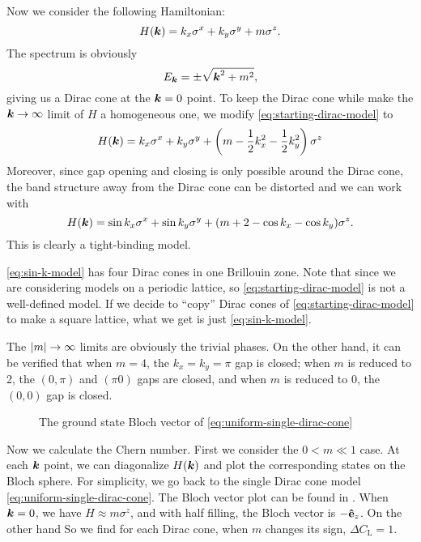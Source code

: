 \documentclass[hyperref, a4paper]{article}
\begin{document}
Now we consider the following Hamiltonian:
\begin{equation}
    H(\vb*{k}) = k_x \sigma^x + k_y \sigma^y + m \sigma^z.
    \label{eq:starting-dirac-model}
\end{equation}
The spectrum is obviously 
\begin{equation}
    E_{\vb*{k}} = \pm \sqrt{\vb*{k}^2 + m^2},
\end{equation}
giving us a Dirac cone at the $\vb*{k} = 0$ point. To keep the Dirac cone while make the $\vb*{k} \to \infty$ limit of $H$ a homogeneous one, we modify \eqref{eq:starting-dirac-model} to
\begin{equation}
    H(\vb*{k}) = k_x \sigma^x + k_y \sigma^y + \left(m - \frac{1}{2} k_x^2 - \frac{1}{2} k_y^2 \right) \sigma^z
    \label{eq:uniform-single-dirac-cone}
\end{equation}
Moreover, since gap opening and closing is only possible around the Dirac cone, the band structure away from 
the Dirac cone can be distorted and we can work with
\begin{equation}
    H(\vb*{k}) = \sin k_x \sigma^x + \sin k_y \sigma^y + (m + 2 - \cos k_x - \cos k_y) \sigma^z.
    \label{eq:sin-k-model}
\end{equation}
This is clearly a tight-binding model.

\eqref{eq:sin-k-model} has four Dirac cones in one Brillouin zone. Note that since we are considering models 
on a periodic lattice, so \eqref{eq:starting-dirac-model} is not a well-defined model. If we decide to ``copy''
Dirac cones of \eqref{eq:starting-dirac-model} to make a square lattice, what we get is just \eqref{eq:sin-k-model}.

The $\abs{m} \to \infty$ limits are obviously the trivial phases. On the other hand, it can be verified that 
when $m=4$, the $k_x = k_y = \pi$ gap is closed; when $m$ is reduced to 2, the $(0, \pi)$ and $(\pi 0)$ gaps 
are closed, and when $m$ is reduced to 0, the $(0, 0)$ gap is closed.

\begin{figure}
    \centering
    
    \caption{The ground state Bloch vector of \eqref{eq:uniform-single-dirac-cone}}
    \label{fig:ground-state-dirac-cone}
\end{figure}

Now we calculate the Chern number. First we consider the $0 < m \ll 1$ case. At each $\vb*{k}$ point, 
we can diagonalize $H(\vb*{k})$ and plot the corresponding states on the Bloch sphere. 
For simplicity, we go back to the single Dirac cone model \eqref{eq:uniform-single-dirac-cone}. 
The Bloch vector plot can be found in .
When $\vb*{k} = 0$, we have $H \approx m \sigma^z$, and with half filling, the Bloch vector is $- \vu{e}_z$.
On the other hand 
So we find for each Dirac cone, when $m$ changes its sign, $\Delta C_\text{L} = 1$.
\end{document}
